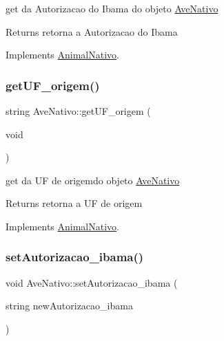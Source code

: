 get da Autorizacao do Ibama do objeto \mbox{\hyperlink{class_ave_nativo}{Ave\+Nativo}} 

\begin{DoxyReturn}{Returns}
retorna a Autorizacao do Ibama 
\end{DoxyReturn}


Implements \mbox{\hyperlink{class_animal_nativo}{Animal\+Nativo}}.

\mbox{\label{class_ave_nativo_a063fe391b9e40d61c08e3d8da14aa3d6}} 
\subsubsection{\texorpdfstring{getUF\_origem()}{getUF\_origem()}}
{\footnotesize\ttfamily string Ave\+Nativo\+::get\+U\+F\+\_\+origem (\begin{DoxyParamCaption}\item[{void}]{ }\end{DoxyParamCaption})\hspace{0.3cm}{\ttfamily [virtual]}}



get da UF de origemdo objeto \mbox{\hyperlink{class_ave_nativo}{Ave\+Nativo}} 

\begin{DoxyReturn}{Returns}
retorna a UF de origem 
\end{DoxyReturn}


Implements \mbox{\hyperlink{class_animal_nativo}{Animal\+Nativo}}.

\mbox{\label{class_ave_nativo_a6c1f962eece15f55777561729a5b7fa5}} 
\subsubsection{\texorpdfstring{setAutorizacao\_ibama()}{setAutorizacao\_ibama()}}
{\footnotesize\ttfamily void Ave\+Nativo\+::set\+Autorizacao\+\_\+ibama (\begin{DoxyParamCaption}\item[{string}]{new\+Autorizacao\+\_\+ibama }\end{DoxyParamCaption})\hspace{0.3cm}{\ttfamily [virtual]}}



